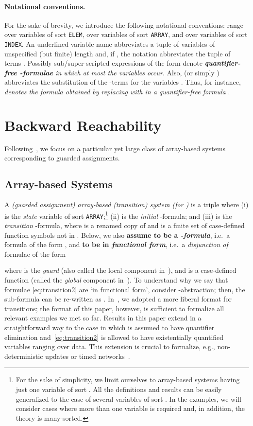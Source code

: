 \documentclass{LMCS}
\theoremstyle{plain}\newtheorem{assumption}[thm]{Assumption}
\theoremstyle{plain}\newtheorem{proposition}[thm]{Proposition}
\theoremstyle{plain}\newtheorem{property}[thm]{Property}
\theoremstyle{plain}\newtheorem{example}[thm]{Example}
\theoremstyle{plain}\newtheorem{claim}[thm]{Claim}
\theoremstyle{plain}\newtheorem{lemma}[thm]{Lemma}
\begin{document}
\paragraph{ {\bf Notational conventions.}}  For
the sake of brevity, we
introduce the following notational conventions:  range over
variables of sort {\tt ELEM},  over variables of sort {\tt ARRAY},
 and  over variables of sort {\tt INDEX}.  An underlined
variable name abbreviates a tuple of variables of unspecified (but
finite) length and, if , the notation 
abbreviates the tuple of terms .  Possibly
sub/super-scripted expressions of the form
 denote \emph{\textbf{ quantifier-free -formulae} in which at most the variables 
  occur}.
Also,  (or simply )
abbreviates the substitution of the -terms  for the variables
.
Thus, for
instance, \emph{ denotes the formula obtained by
replacing  with  in a quantifier-free formula
}.



\section{Backward Reachability}
\label{sec:array}
Following~\cite{avocs08}, we focus on a particular yet large class of
array-based systems corresponding to guarded assignments.


\subsection{Array-based Systems}
\label{subsec:array-based}
A \emph{(guarded assignment) array-based (transition) system (for
  )} is a triple  where (i)  is the
\emph{state} variable of sort \texttt{ARRAY};\footnote{For the sake of
simplicity, we limit ourselves to array-based systems having just
  one variable  of sort . All the definitions and
  results can be easily generalized to the case of several variables of
  sort .  In the examples, we will consider cases
  where more than one variable is required and, in addition, the
  theory  is many-sorted.}  (ii)  is the \emph{initial}
-formula; and (iii)  is the \emph{transition}
-formula, where  is a renamed copy
of  and  is a finite set of case-defined function symbols
not in .  Below, we also \textbf{assume 
  to be a \emph{-formula}}, i.e.\ a formula of the form
, and \textbf{ to be in
  \emph{functional form}}, i.e.\ a \emph{disjunction of} formulae of
the form

where  is the \emph{guard} (also called the local component
in~\cite{ijcar08}), and  is a case-defined function (called the
\emph{global} component in~\cite{ijcar08}).  To understand why we say
that formulae \eqref{eq:transition2} are `in functional form',
consider -abstraction; then, the sub-formula  can be re-written as .
In~\cite{ijcar08}, we adopted a more liberal format for transitions;
the format of this paper, however, is sufficient to formalize all
relevant examples we met so far. Results in this paper extend in a
straightforward way to the case in which  is assumed to have
quantifier elimination and~\eqref{eq:transition2} is allowed to have
existentially quantified variables ranging over data.
This extension is crucial to formalize, e.g., non-deterministic
updates
or timed networks~\cite{verify}.
\end{document}
